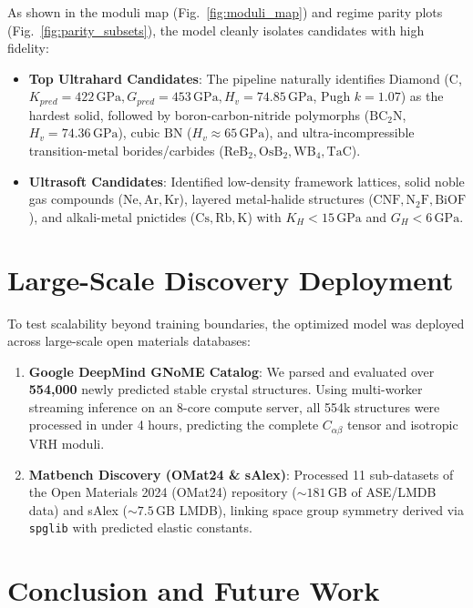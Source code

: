 \documentclass[twocolumn,10pt,aps,prb,superscriptaddress,floatfix]{revtex4-2}
\begin{document}
As shown in the moduli map (Fig.~\ref{fig:moduli_map}) and regime parity plots (Fig.~\ref{fig:parity_subsets}), the model cleanly isolates candidates with high fidelity:
\begin{itemize}
    \item \textbf{Top Ultrahard Candidates}: The pipeline naturally identifies Diamond ($\mathrm{C}$, $K_{pred} = 422\,\mathrm{GPa}, G_{pred} = 453\,\mathrm{GPa}, H_v = 74.85\,\mathrm{GPa}$, Pugh $k = 1.07$) as the hardest solid, followed by boron-carbon-nitride polymorphs ($\mathrm{BC}_2\mathrm{N}$, $H_v = 74.36\,\mathrm{GPa}$), cubic $\mathrm{BN}$ ($H_v \approx 65\,\mathrm{GPa}$), and ultra-incompressible transition-metal borides/carbides ($\mathrm{ReB}_2, \mathrm{OsB}_2, \mathrm{WB}_4, \mathrm{TaC}$).
    \item \textbf{Ultrasoft Candidates}: Identified low-density framework lattices, solid noble gas compounds ($\mathrm{Ne}, \mathrm{Ar}, \mathrm{Kr}$), layered metal-halide structures ($\mathrm{CNF}, \mathrm{N}_2\mathrm{F}, \mathrm{BiOF}$), and alkali-metal pnictides ($\mathrm{Cs}, \mathrm{Rb}, \mathrm{K}$) with $K_H < 15\,\mathrm{GPa}$ and $G_H < 6\,\mathrm{GPa}$.
\end{itemize}

\section{Large-Scale Discovery Deployment}
\label{sec:deployment}

To test scalability beyond training boundaries, the optimized model was deployed across large-scale open materials databases:
\begin{enumerate}
    \item \textbf{Google DeepMind GNoME Catalog}: We parsed and evaluated over \textbf{554,000} newly predicted stable crystal structures. Using multi-worker streaming inference on an 8-core compute server, all 554k structures were processed in under 4 hours, predicting the complete $C_{\alpha\beta}$ tensor and isotropic VRH moduli.
    \item \textbf{Matbench Discovery (OMat24 & sAlex)}: Processed 11 sub-datasets of the Open Materials 2024 (OMat24) repository ($\sim 181\,\mathrm{GB}$ of ASE/LMDB data) and sAlex ($\sim 7.5\,\mathrm{GB}$ LMDB), linking space group symmetry derived via \texttt{spglib} with predicted elastic constants.
\end{enumerate}

\section{Conclusion and Future Work}
\label{sec:conclusion}
\end{document}
